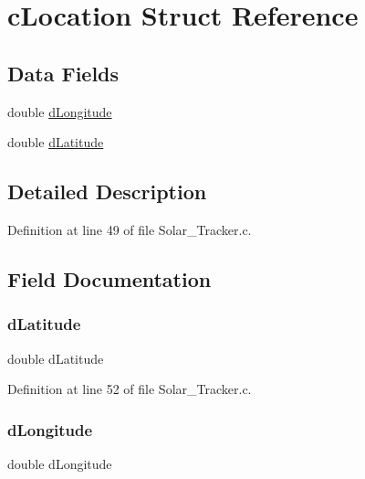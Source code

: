 \hypertarget{structc_location}{}\section{c\+Location Struct Reference}
\label{structc_location}
\subsection*{Data Fields}
\begin{DoxyCompactItemize}
\item 
double \hyperlink{structc_location_a3dfe793accbbd7ca8f5c1d7e17780b94}{d\+Longitude}
\item 
double \hyperlink{structc_location_a730253d22fcb6362c501d13bcbae46d4}{d\+Latitude}
\end{DoxyCompactItemize}


\subsection{Detailed Description}


Definition at line 49 of file Solar\+\_\+\+Tracker.\+c.



\subsection{Field Documentation}
\mbox{\label{structc_location_a730253d22fcb6362c501d13bcbae46d4}} 
\subsubsection{\texorpdfstring{d\+Latitude}{dLatitude}}
{\footnotesize\ttfamily double d\+Latitude}



Definition at line 52 of file Solar\+\_\+\+Tracker.\+c.

\mbox{\label{structc_location_a3dfe793accbbd7ca8f5c1d7e17780b94}} 
\subsubsection{\texorpdfstring{d\+Longitude}{dLongitude}}
{\footnotesize\ttfamily double d\+Longitude}



